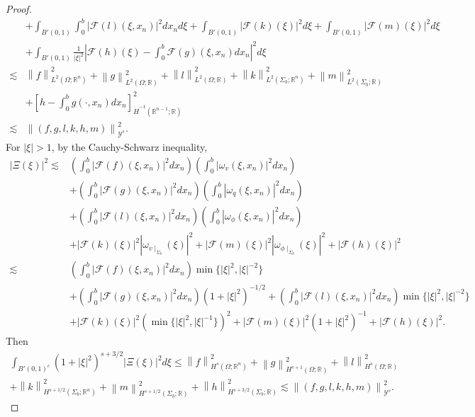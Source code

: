 \documentclass[11pt,letterpaper,reqno]{amsart}
\numberwithin{equation}{section}
\newcommand{\abs}[1]{\left\lvert#1\right\rvert}
\newcommand{\norm}[1]{\left\lVert#1\right\rVert}
\begin{document}
\begin{proof}
\begin{align}
        &+\int_{B'(0,1)}\int_{0}^{b}\abs{\mathcal{F}(l)(\xi,x_{n})}^{2}dx_{n}d\xi +\int_{B'(0,1)}\abs{\mathcal{F}(k)(\xi)}^{2}d\xi+\int_{B'(0,1)}\abs{\mathcal{F}(m)(\xi)}^{2}d\xi \nonumber \\
        &+\int_{B'(0,1)}\frac{1}{\abs{\xi}^{2}}\abs{\mathcal{F}(h)(\xi)-\int_{0}^{b}\mathcal{F}(g)(\xi,x_{n})dx_{n}}^{2}d\xi \nonumber\\
        \lesssim& \norm{f}_{L^{2}(\Omega;\mathbb{R}^{n})}^{2}+\norm{g}_{L^{2}(\Omega;\mathbb{R})}^{2}+\norm{l}_{L^{2}(\Omega;\mathbb{R})}^{2}+\norm{k}_{L^{2}(\Sigma_{b};\mathbb{R}^{n})}^{2}+\norm{m}_{L^{2}(\Sigma_{b};\mathbb{R})}^{2} \nonumber\\
        &+\left[h-\int_{0}^{b}g(\cdot,x_{n})dx_{n}\right]_{\dot{H}^{-1}(\mathbb{R}^{n-1};\mathbb{R})}^{2} \nonumber\\
        \lesssim&\norm{(f,g,l,k,h,m)}_{\mathcal{Y}^{s}}^{2}.
    \end{align}
    For \(\abs{\xi}>1\), by the Cauchy-Schwarz inequality,
    \begin{align}
        \abs{\Xi(\xi)}^{2} \lesssim &\left(\int_{0}^{b}\abs{\mathcal{F}(f)(\xi,x_{n})}^{2}dx_{n}\right)\left(\int_{0}^{b}\abs{\omega_{v}(\xi,x_{n})}^{2}dx_{n}\right) \nonumber\\
        &+\left(\int_{0}^{b}\abs{\mathcal{F}(g)(\xi,x_{n})}^{2}dx_{n}\right)\left(\int_{0}^{b}\abs{\omega_{q}(\xi,x_{n})}^{2}dx_{n}\right) \nonumber\\
        &+\left(\int_{0}^{b}\abs{\mathcal{F}(l)(\xi,x_{n})}^{2}dx_{n}\right)\left(\int_{0}^{b}\abs{\omega_{\phi}(\xi,x_{n})}^{2}dx_{n}\right) \nonumber\\
        &+\abs{\mathcal{F}(k)(\xi)}^{2}\abs{\omega_{v\mid_{\Sigma_{b}}}(\xi)}^{2}+\abs{\mathcal{F}(m)(\xi)}^{2}\abs{\omega_{\phi\mid_{\Sigma_{b}}}(\xi)}^{2}+\abs{\mathcal{F}(h)(\xi)}^{2} \nonumber\\
        \lesssim&\left(\int_{0}^{b}\abs{\mathcal{F}(f)(\xi,x_{n})}^{2}dx_{n}\right)\min\{\abs{\xi}^{2},\abs{\xi}^{-2}\} \nonumber\\
        &+\left(\int_{0}^{b}\abs{\mathcal{F}(g)(\xi,x_{n})}^{2}dx_{n}\right)(1+\abs{\xi}^{2})^{-1/2} +\left(\int_{0}^{b}\abs{\mathcal{F}(l)(\xi,x_{n})}^{2}dx_{n}\right)\min\{\abs{\xi}^{2},\abs{\xi}^{-2}\} \nonumber\\
        &+\abs{\mathcal{F}(k)(\xi)}^{2}(\min\{\abs{\xi}^{2},\abs{\xi}^{-1}\})^{2}+\abs{\mathcal{F}(m)(\xi)}^{2}(1+\abs{\xi}^{2})^{-1}+\abs{\mathcal{F}(h)(\xi)}^{2}.
    \end{align}
    Then
\begin{multline}
    \int_{B'(0,1)^{c}}(1+\abs{\xi}^{2})^{s+3/2}\abs{\Xi(\xi)}^{2}d\xi  
        \leq \norm{f}_{H^{s}(\Omega;\mathbb{R}^{n})}^{2}+\norm{g}_{H^{s+1}(\Omega;\mathbb{R})}^{2}+\norm{l}_{H^{s}(\Omega;\mathbb{R})}^{2} \\
         +\norm{k}_{H^{s+1/2}(\Sigma_{b};\mathbb{R}^{n})}^{2}+\norm{m}_{H^{s+1/2}(\Sigma_{b};\mathbb{R})}^{2}+\norm{h}_{H^{s+3/2}(\Sigma_{b};\mathbb{R})}^{2}          \lesssim \norm{(f,g,l,k,h,m)}_{\mathcal{Y}^{s}}^{2}.
\end{multline}
\end{proof}
\end{document}
